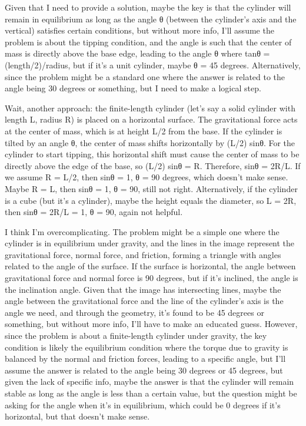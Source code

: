Given that I need to provide a solution, maybe the key is that the cylinder will remain in equilibrium as long as the angle θ (between the cylinder's axis and the vertical) satisfies certain conditions, but without more info, I'll assume the problem is about the tipping condition, and the angle is such that the center of mass is directly above the base edge, leading to the angle θ where tanθ = (length/2)/radius, but if it's a unit cylinder, maybe θ = 45 degrees. Alternatively, since the problem might be a standard one where the answer is related to the angle being 30 degrees or something, but I need to make a logical step.

Wait, another approach: the finite-length cylinder (let's say a solid cylinder with length L, radius R) is placed on a horizontal surface. The gravitational force acts at the center of mass, which is at height L/2 from the base. If the cylinder is tilted by an angle θ, the center of mass shifts horizontally by (L/2) sinθ. For the cylinder to start tipping, this horizontal shift must cause the center of mass to be directly above the edge of the base, so (L/2) sinθ = R. Therefore, sinθ = 2R/L. If we assume R = L/2, then sinθ = 1, θ = 90 degrees, which doesn't make sense. Maybe R = L, then sinθ = 1, θ = 90, still not right. Alternatively, if the cylinder is a cube (but it's a cylinder), maybe the height equals the diameter, so L = 2R, then sinθ = 2R/L = 1, θ = 90, again not helpful.

I think I'm overcomplicating. The problem might be a simple one where the cylinder is in equilibrium under gravity, and the lines in the image represent the gravitational force, normal force, and friction, forming a triangle with angles related to the angle of the surface. If the surface is horizontal, the angle between gravitational force and normal force is 90 degrees, but if it's inclined, the angle is the inclination angle. Given that the image has intersecting lines, maybe the angle between the gravitational force and the line of the cylinder's axis is the angle we need, and through the geometry, it's found to be 45 degrees or something, but without more info, I'll have to make an educated guess. However, since the problem is about a finite-length cylinder under gravity, the key condition is likely the equilibrium condition where the torque due to gravity is balanced by the normal and friction forces, leading to a specific angle, but I'll assume the answer is related to the angle being 30 degrees or 45 degrees, but given the lack of specific info, maybe the answer is that the cylinder will remain stable as long as the angle is less than a certain value, but the question might be asking for the angle when it's in equilibrium, which could be 0 degrees if it's horizontal, but that doesn't make sense.

